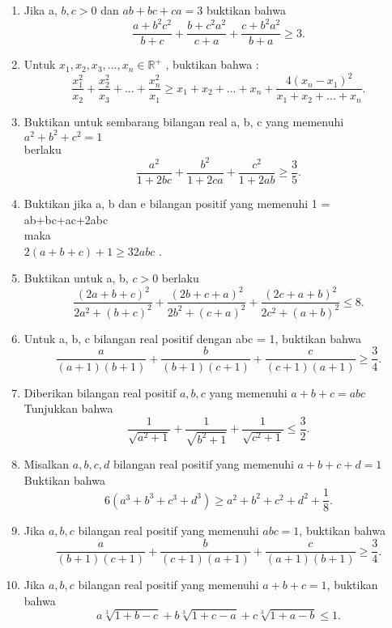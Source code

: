 \documentclass[11pt]{scrartcl}
\begin{document}
\begin{enumerate}
\item Jika a, \(b,c>0\) dan \(ab+bc+ca=3\) buktikan bahwa \\
\[\frac{a+b^{2}c^{2}}{b+c}+\frac{b+c^{2}a^{2}}{c+a}+\frac{c+b^{2}a^{2}}{b+a}\ge3.\]

\item Untuk \(x_{1},x_{2},x_{3},...,x_{n}\in\mathbb{R}^{+}\) , buktikan bahwa : \\
\[\frac{x_{1}^{2}}{x_{2}}+\frac{x_{2}^{2}}{x_{3}}+...+\frac{x_{n}^{2}}{x_{1}}\ge x_{1}+x_{2}+...+x_{n}+\frac{4(x_{n}-x_{1})^{2}}{x_{1}+x_{2}+...+x_{n}}.\]

\item Buktikan untuk sembarang bilangan real a, b, c yang memenuhi \(a^{2}+b^{2}+c^{2}=1\) \\
berlaku \\
\[\frac{a^{2}}{1+2bc}+\frac{b^{2}}{1+2ca}+\frac{c^{2}}{1+2ab}\ge\frac{3}{5}.\]

\item Buktikan jika a, b dan e bilangan positif yang memenuhi 1 = ab+bc+ac+2abc \\
maka \\
\(2(a+b+c)+1\ge32abc\) .

\item Buktikan untuk a, b, \(c>0\) berlaku \\
\[\frac{(2a+b+c)^{2}}{2a^{2}+(b+c)^{2}}+\frac{(2b+c+a)^{2}}{2b^{2}+(c+a)^{2}}+\frac{(2c+a+b)^{2}}{2c^{2}+(a+b)^{2}}\le8.\]

\item Untuk a, b, c bilangan real positif dengan abc = 1, buktikan bahwa \\
\[\frac{a}{(a+1)(b+1)}+\frac{b}{(b+1)(c+1)}+\frac{c}{(c+1)(a+1)}\ge\frac{3}{4}.\]

\item Diberikan bilangan real positif $a, b, c$ yang memenuhi $a+b+c=abc$ 
Tunjukkan bahwa
\[\frac{1}{\sqrt{a^{2}+1}}+\frac{1}{\sqrt{b^{2}+1}}+\frac{1}{\sqrt{c^{2}+1}}\le\frac{3}{2}.\]

\item Misalkan $a, b, c, d$ bilangan real positif yang memenuhi $a+b+c+d=1$ 
Buktikan bahwa
\[6(a^{3}+b^{3}+c^{3}+d^{3})\ge a^{2}+b^{2}+c^{2}+d^{2}+\frac{1}{8}.\]

\item Jika $a, b, c$ bilangan real positif yang memenuhi $abc = 1$, buktikan bahwa
\[\frac{a}{(b+1)(c+1)}+\frac{b}{(c+1)(a+1)}+\frac{c}{(a+1)(b+1)}\ge\frac{3}{4}.\]

\item Jika $a, b, c$ bilangan real positif yang memenuhi $a+b+c=1$, buktikan bahwa
\[a\sqrt[3]{1+b-c}+b\sqrt[3]{1+c-a}+c\sqrt[3]{1+a-b}\le1.\]


\end{enumerate}
\end{document}

